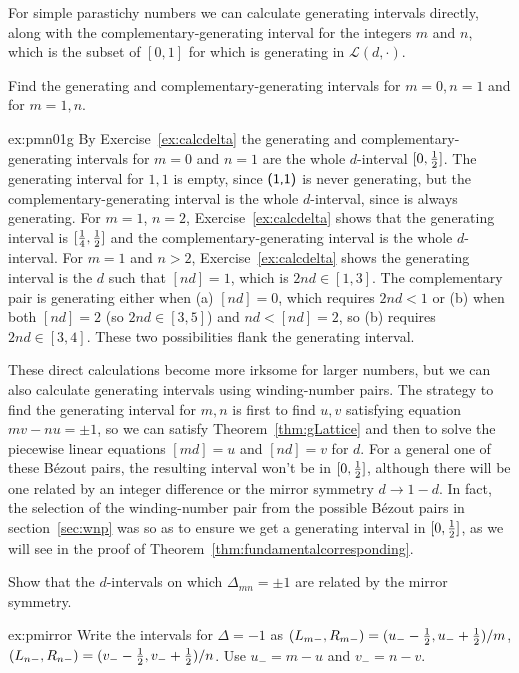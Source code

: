 For simple parastichy numbers we can calculate generating intervals directly, along with the 
complementary-generating interval for the integers $m$ and $n$, which is the subset of  $[0,1]$ for which   is generating in  $\mathcal{L}(d,\cdot)$.
\begin{jExercise}\label{ex:pmn01g}
	Find the generating and complementary-generating intervals for $m=0,n=1$ and for $m=1,n$. 
\end{jExercise}
\begin{jAnswer}{ex:pmn01g}
	 By Exercise~\ref{ex:calcdelta} the generating and complementary-generating intervals for $m=0$ and $n=1$ are the whole $d$-interval  $[0,\textstyle{\frac{1}{2}}]$.  
	The generating interval for $1,1$ is empty, since $\textsf{(1,1)}$ is never generating, but the complementary-generating interval is the whole $d$-interval, since  is always generating.
For $m=1$, $n=2$, Exercise~\ref{ex:calcdelta} shows that the generating interval is $[\textstyle{\frac{1}{4}},\textstyle{\frac{1}{2}}]$ and the complementary-generating interval is the whole $d$-interval.
For $m=1$ and $n>2$,  Exercise~\ref{ex:calcdelta} shows the generating interval is the $d$ such that $[nd]=1$, which is $2nd\in [1,3]$.  
The complementary pair is generating either when (a) $[nd]=0$, which requires $2nd<1$ or (b) when both $[nd]=2$ (so $2nd\in [3,5]$) and $nd<[nd]=2$,
so (b) requires $2nd\in[3,4]$. These two possibilities flank the generating interval.
\end{jAnswer}
These direct calculations become more irksome for larger numbers, but we can also calculate generating intervals using winding-number pairs. The strategy to find the generating interval for ${m,n}$ is first to find $u,v$ satisfying equation $mv-nu=\pm 1$, so we can satisfy Theorem~\ref{thm:gLattice} and then to solve the piecewise linear equations $[md]=u$ and $[nd]=v$ for $d$. For a general one of these B\'ezout pairs, the resulting interval won't be in $[0,\textstyle{\frac{1}{2}}]$, although there will be one related by an integer difference or the mirror symmetry $d\rightarrow1-d$. In fact, the selection of the winding-number pair from the possible B\'ezout pairs in section~\ref{sec:wnp} was so as to ensure we get a generating interval in $[0,\textstyle{\frac{1}{2}}]$, as we will see in the proof of Theorem~\ref{thm:fundamentalcorresponding}. 


\begin{jExercise}\label{ex:pmirror}
	Show that the $d$-intervals on which
	$\Delta_{mn}=\pm1$ are related by the mirror symmetry.
\end{jExercise}
\begin{jAnswer}{ex:pmirror}
	Write the intervals for $\Delta=-1$ as $(L_{m-},R_{m-})= (u_--\textstyle{\frac{1}{2}},u_-+\textstyle{\frac{1}{2}})/m$, $(L_{n-},R_{n-})= (v_--\textstyle{\frac{1}{2}},v_-+\textstyle{\frac{1}{2}})/n$.
	Use $u_-=m-u$ and $v_-=n-v$. 
\end{jAnswer}

